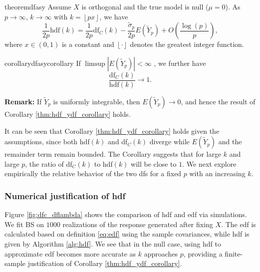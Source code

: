 \begin{restatable}{theorem}{dfasy}
	\label{thm:hdf_ydf_representation}
	Assume $X$ is orthogonal and the true model is null ($\mu=0$). As $p\rightarrow  \infty$,  $k\rightarrow  \infty$ with $k=\left \lfloor{px}\right \rfloor$, we have
	\begin{equation}
	\label{eq:hdf_ydf_yp_representation}
	\frac{1}{2p} \text{hdf}(k) = \frac{1}{2p}\text{df}_C(k) - \frac{\tilde{\sigma}_p}{2p}E(\tilde{Y}_p) + O\left(\frac{\log(p)}{p} \right),
	\end{equation}
	where $x \in (0,1)$ is a constant and $\left \lfloor{\cdot}\right \rfloor$ denotes the greatest integer function.
\end{restatable}

\begin{restatable}{corollary}{dfasycorollary}
	\label{thm:hdf_ydf_corollary}
	If $\limsup |E(\tilde{Y}_p)| < \infty$ , we further have
	\begin{equation}
	\label{eq:main_corollary}
	\frac{\text{df}_C(k)}{\text{hdf}(k)} \rightarrow 1.
	\end{equation}
\end{restatable}
\noindent\textbf{Remark:} If $\tilde{Y}_p$ is uniformly integrable, then $E(\tilde{Y}_p) \rightarrow 0$, and hence the result of Corollary \ref{thm:hdf_ydf_corollary} holds.

It can be seen that Corollary \ref{thm:hdf_ydf_corollary} holds given the assumptions, since both hdf$(k)$ and df$_C(k)$ diverge while $E(\tilde{Y}_p)$ and the remainder term remain bounded. The Corollary suggests that for large $k$ and large $p$, the ratio of df$_C(k)$ to hdf$(k)$ will be close to $1$. We next explore empirically the relative behavior of the two dfs for a fixed $p$ with an increasing $k$. 

\subsubsection{Numerical justification of hdf}
Figure \ref{fig:dfc_dflambda} shows the comparison of hdf and edf via simulations. We fit BS on $1000$ realizations of the response generated after fixing $X$. The edf is calculated based on definition \eqref{eq:edf} using the sample covariances, while hdf is given by Algorithm \ref{alg:hdf}. We see that in the null case, using hdf to approximate edf becomes more accurate as $k$ approaches $p$, providing a finite-sample justification of Corollary \ref{thm:hdf_ydf_corollary}. 

